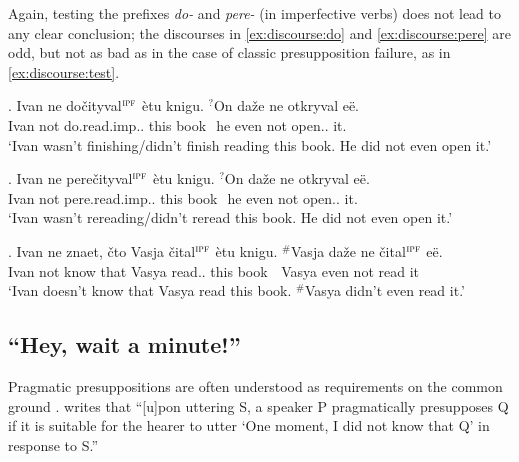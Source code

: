 Again, testing the prefixes \textit{do-} and \textit{pere-} (in imperfective verbs) does not lead to any clear conclusion; the discourses in \ref{ex:discourse:do} and \ref{ex:discourse:pere} are odd, but not as bad as in the case of classic presupposition failure, as in \ref{ex:discourse:test}.

\exg. \label{ex:discourse:do}Ivan ne do\v{c}ityval$^{\textsc{ipf}}$ \`{e}tu knigu. $^?$On da\v{z}e ne otkryval e\"{e}.\\
Ivan not do.read.imp.. this book \textcolor{white}{$^?$}he even not open.. it.\\
\trans `Ivan wasn't finishing/didn't finish reading this book. He did not even open it.'

\exg. \label{ex:discourse:pere}Ivan ne pere\v{c}ityval$^{\textsc{ipf}}$ \`{e}tu knigu. $^?$On da\v{z}e ne otkryval e\"{e}.\\
Ivan not pere.read.imp.. this book \textcolor{white}{$^?$}he even not open.. it.\\
\trans `Ivan wasn't rereading/didn't reread this book. He did not even open it.'

\exg. \label{ex:discourse:test}Ivan ne znaet, \v{c}to Vasja \v{c}ital$^{\textsc{ipf}}$ \`{e}tu knigu. $^\#$Vasja da\v{z}e ne \v{c}ital$^{\textsc{ipf}}$ e\"{e}.\\
Ivan not know that Vasya read.. this book \textcolor{white}{$^\#$}Vasya even not read it\\
\trans `Ivan doesn't know that Vasya read this book. $^\#$Vasya didn't even read it.'


\subsection{``Hey, wait a minute!''}
Pragmatic presuppositions are often understood as requirements on the common ground \citep[see e.g.,][]{Karttunen:73, Stalnaker:73, Shanon:76, Heim:83}. \citet[][248]{Shanon:76} writes that ``[u]pon uttering S, a speaker P pragmatically presupposes Q if it is suitable for the hearer to utter `One moment, I did not know that Q' in response to S.''

